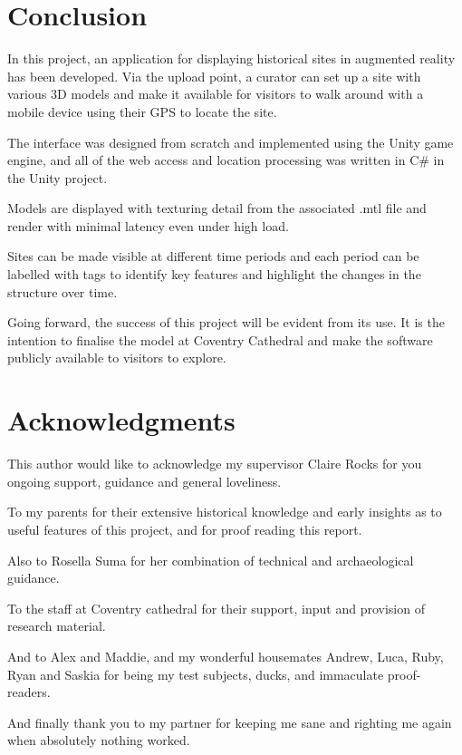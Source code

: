 \documentclass[12pt, a4paper]{article}
\begin{document}
\section{Conclusion}
In this project, an application for displaying historical sites in augmented reality has been developed. Via the upload point, a curator can set up a site with various 3D models and make it available for visitors to walk around with a mobile device using their GPS to locate the site. 

The interface was designed from scratch and implemented using the Unity game engine, and all of the web access and location processing was written in C\# in the Unity project. 

Models are displayed with texturing detail from the associated .mtl file and render with minimal latency even under high load. 

Sites can be made visible at different time periods and each period can be labelled with tags to identify key features and highlight the changes in the structure over time.

Going forward, the success of this project will be evident from its use. It is the intention to finalise the model at Coventry Cathedral and make the software publicly available to visitors to explore.

\section{Acknowledgments}
This author would like to acknowledge my supervisor Claire Rocks for you ongoing support, guidance and general loveliness.

To my parents for their extensive historical knowledge and early insights as to useful features of this project, and for proof reading this report.

Also to Rosella Suma for her combination of technical and archaeological guidance.

To the staff at Coventry cathedral for their support, input and provision of research material.

And to Alex and Maddie, and my wonderful housemates Andrew, Luca, Ruby, Ryan and Saskia for being my test subjects, ducks, and immaculate proof-readers.

And finally thank you to my partner for keeping me sane and righting me again when absolutely nothing worked. 



\appendix
\end{document}
